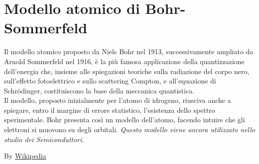 \documentclass{book}
\begin{document}
\section{Modello atomico di Bohr-Sommerfeld}
Il modello atomico proposto da Niels Bohr nel 1913, successivamente ampliato da Arnold Sommerfeld nel 1916, è la più famosa applicazione della quantizzazione dell'energia che, insieme alle spiegazioni teoriche sulla radiazione del corpo nero, sull'effetto fotoelettrico e sullo scattering Compton, e all'equazione di Schrödinger, costituiscono la base della meccanica quantistica.\\
Il modello, proposto inizialmente per l'atomo di idrogeno, riusciva anche a spiegare, entro il margine di errore statistico, l'esistenza dello spettro sperimentale. Bohr presenta così un modello dell'atomo, facendo intuire che gli elettroni si muovono su degli orbitali. \textit{Questo modello viene ancora utilizzato nello studio dei Semiconduttori.} 
\begin{center}
	By \href{https://it.wikipedia.org/wiki/Modello_atomico_di_Bohr}{Wikipedia}
\end{center}
\end{document}
